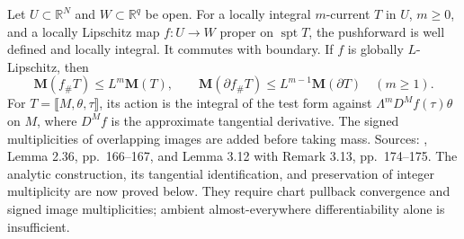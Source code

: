 \begin{theorem}\label{thm:lipschitz-current-pushforward}
Let $U\subset\mathbb R^N$ and $W\subset\mathbb R^q$ be open. For a locally integral $m$-current $T$ in $U$, $m\geq0$, and a locally Lipschitz map $f:U\to W$ proper on $\operatorname{spt}T$, the pushforward is well defined and locally integral. It commutes with boundary. If $f$ is globally $L$-Lipschitz, then
\[
 \mathbf M(f_\#T)\leq L^m\mathbf M(T),\qquad
 \mathbf M(\partial f_\#T)\leq L^{m-1}\mathbf M(\partial T)\quad(m\geq1).
\]
For $T=\llbracket M,\theta,\tau\rrbracket$, its action is the integral of the test form against $\Lambda^m D^Mf(\tau)\theta$ on $M$, where $D^Mf$ is the approximate tangential derivative. The signed multiplicities of overlapping images are added before taking mass. Sources: \cite{Sim18}, Lemma 2.36, pp.~166--167, and Lemma 3.12 with Remark 3.13, pp.~174--175. The analytic construction, its tangential identification, and preservation of integer multiplicity are now proved below. They require chart pullback convergence and signed image multiplicities; ambient almost-everywhere differentiability alone is insufficient.
\end{theorem}
